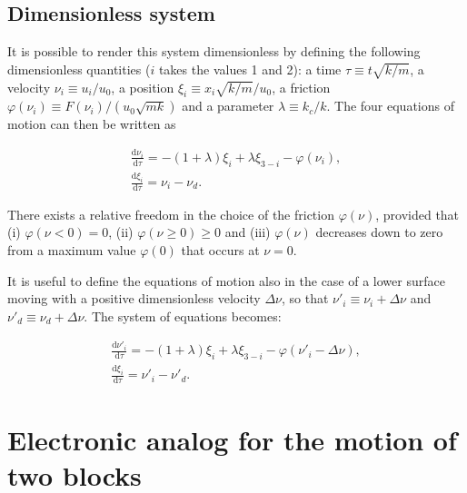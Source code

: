 \subsection{Dimensionless system}\label{subsec: dimensionless 2 block motion}

It is possible to render this system dimensionless by defining the following dimensionless quantities ($i$ takes the values 1 and 2):
a time $\tau\equiv t\sqrt{k/m}$, a velocity $\nu_i\equiv u_i/u_0$, a position $\xi_i\equiv x_i \sqrt{k/m}/u_0$,
a friction $\varphi(\nu_i)\equiv F(\nu_i)/(u_0\sqrt{mk})$ and a parameter $\lambda\equiv k_c/k$.
The four equations of motion can then be written as

\begin{equation}
\label{eq: 2 block motion dimensionless}
\begin{gathered}
    \frac{\text{d}\nu_i}{\text{d}\tau}=-(1+\lambda)\xi_i+\lambda\xi_{3-i}-\varphi(\nu_i),\\[10pt]
    \frac{\text{d}\xi_i}{\text{d}\tau}=\nu_i-\nu_d.
\end{gathered}
\end{equation}

There exists a relative freedom in the choice of the friction $\varphi(\nu)$, provided that
(i) $\varphi(\nu<0)=0$, (ii) $\varphi(\nu\geq0)\geq0$ and (iii) $\varphi(\nu)$ decreases down to zero from a
maximum value $\varphi(0)$ that occurs at $\nu=0$.

It is useful to define the equations of motion also in the case of a lower surface moving with a positive
dimensionless velocity $\Delta\nu$, so that $\nu'_i\equiv\nu_i+\Delta\nu$ and $\nu'_d\equiv\nu_d+\Delta\nu$.
The system of equations becomes:

\begin{equation}
    \label{eq: 2 block motion dimensionless moving surface}
    \begin{gathered}
        \frac{\text{d}\nu'_i}{\text{d}\tau}=-(1+\lambda)\xi_i+\lambda\xi_{3-i}-\varphi(\nu'_i-\Delta\nu),\\[10pt]
        \frac{\text{d}\xi_i}{\text{d}\tau}=\nu'_i-\nu'_d.
    \end{gathered}
\end{equation}


\section{Electronic analog for the motion of two blocks}\label{sec: electronic analog}

